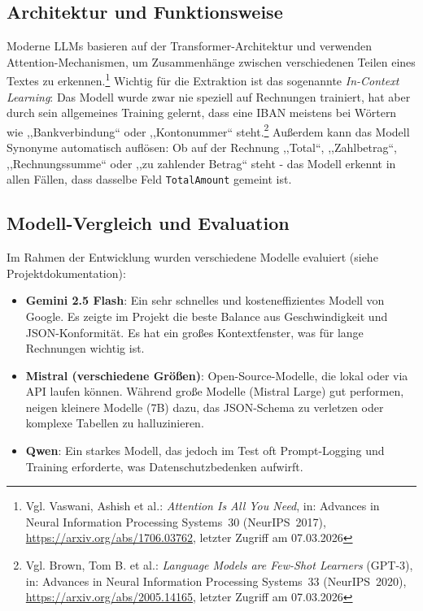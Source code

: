 \subsection{Architektur und Funktionsweise}
Moderne LLMs basieren auf der Transformer-Architektur und verwenden Attention-Mechanismen, um Zusammenhänge zwischen verschiedenen Teilen eines Textes zu erkennen.\footnote{Vgl. Vaswani, Ashish et al.: \textit{Attention Is All You Need}, in: Advances in Neural Information Processing Systems~30 (NeurIPS~2017), \url{https://arxiv.org/abs/1706.03762}, letzter Zugriff am 07.03.2026} Wichtig für die Extraktion ist das sogenannte \textit{In-Context Learning}: Das Modell wurde zwar nie speziell auf Rechnungen trainiert, hat aber durch sein allgemeines Training gelernt, dass eine IBAN meistens bei Wörtern wie ,,Bankverbindung`` oder ,,Kontonummer`` steht.\footnote{Vgl. Brown, Tom B. et al.: \textit{Language Models are Few-Shot Learners} (GPT-3), in: Advances in Neural Information Processing Systems~33 (NeurIPS~2020), \url{https://arxiv.org/abs/2005.14165}, letzter Zugriff am 07.03.2026}
Außerdem kann das Modell Synonyme automatisch auflösen: Ob auf der Rechnung ,,Total``, ,,Zahlbetrag``, ,,Rechnungssumme`` oder ,,zu zahlender Betrag`` steht - das Modell erkennt in allen Fällen, dass dasselbe Feld \texttt{TotalAmount} gemeint ist.

\subsection{Modell-Vergleich und Evaluation}
Im Rahmen der Entwicklung wurden verschiedene Modelle evaluiert (siehe Projektdokumentation):
\begin{itemize}
    \item \textbf{Gemini 2.5 Flash}: Ein sehr schnelles und kosteneffizientes Modell von Google. Es zeigte im Projekt die beste Balance aus Geschwindigkeit und JSON-Konformität. Es hat ein großes Kontextfenster, was für lange Rechnungen wichtig ist.
    \item \textbf{Mistral (verschiedene Größen)}: Open-Source-Modelle, die lokal oder via API laufen können. Während große Modelle (Mistral Large) gut performen, neigen kleinere Modelle (7B) dazu, das JSON-Schema zu verletzen oder komplexe Tabellen zu halluzinieren.
    \item \textbf{Qwen}: Ein starkes Modell, das jedoch im Test oft Prompt-Logging und Training erforderte, was Datenschutzbedenken aufwirft.
\end{itemize}

